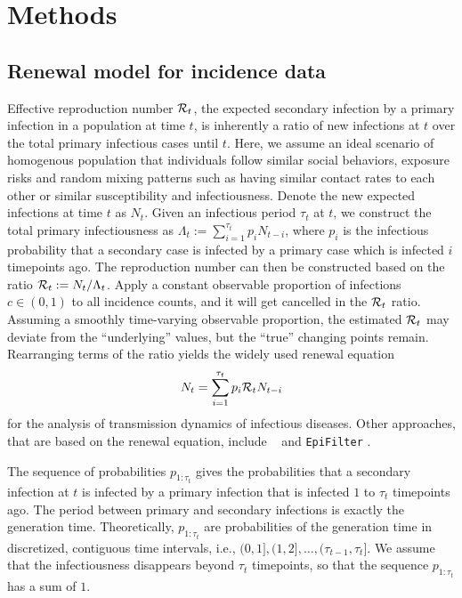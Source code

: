 \section{Methods}

\subsection{Renewal model for incidence data} 

Effective reproduction number $\mathcal{R}_t$, the expected secondary infection by a primary infection in a population at time $t$, is inherently a ratio of new infections at $t$ over the total primary infectious cases until $t$. Here, we assume an ideal scenario of homogenous population that individuals follow similar social behaviors, exposure risks and random mixing patterns such as having similar contact rates to each other or similar susceptibility and infectiousness. 
Denote the new expected infections at time $t$ as $N_t$. Given an infectious period $\tau_t$ at $t$, we construct the total primary infectiousness as $\Lambda_t := \sum_{i=1}^{\tau_t} p_i N_{t-i}$, where $p_i$ is the infectious probability that a secondary case is infected by a primary case which is infected $i$ timepoints ago. The reproduction number can then be constructed based on the ratio $\mathcal{R}_t := N_t / \Lambda_t$. Apply a constant observable proportion of infections $c\in (0,1)$ to all incidence counts, and it will get cancelled in the $\mathcal{R}_t$ ratio. Assuming a smoothly time-varying observable proportion, the estimated $\mathcal{R}_t$ may deviate from the ``underlying'' values, but the ``true'' changing points remain. Rearranging terms of the ratio yields the widely used renewal equation 
\begin{equation} \label{eq:renew-equation}
  N_t = \sum_{i=1}^{\tau_t} p_i\mathcal{R}_t N_{t-i}
\end{equation}
for the analysis of transmission dynamics of infectious diseases. Other approaches, that are based on the renewal equation, include \EpiEstim\ \citep{cori2013new} and \texttt{EpiFilter} \citep{parag2021improved}. 

The sequence of probabilities $p_{1:\tau_t}$ gives the probabilities that a secondary infection at $t$ is infected by a primary infection that is infected $1$ to $\tau_t$ timepoints ago. The period between primary and secondary infections is exactly the generation time. Theoretically, $p_{1:\tau_t}$ are probabilities of the generation time in discretized, contiguous time intervals, i.e., $(0,1], (1,2], \dots, (\tau_{t-1}, \tau_t]$. We assume that the infectiousness disappears beyond $\tau_t$ timepoints, so that the sequence $p_{1:\tau_t}$ has a sum of $1$. 

